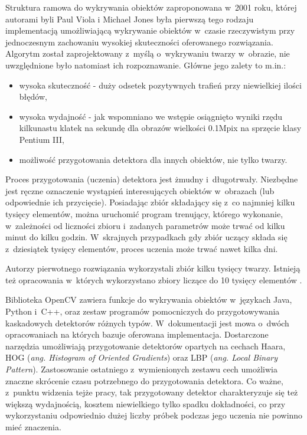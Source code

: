 Struktura ramowa do wykrywania obiektów zaproponowana w~2001 roku, której
autorami byli Paul Viola i Michael Jones \cite{DBLP:conf/cvpr/ViolaJ01}
była pierwszą tego
rodzaju implementacją umożliwiającą wykrywanie obiektów w~czasie
rzeczywistym przy jednoczesnym zachowaniu wysokiej skuteczności
oferowanego rozwiązania. Algorytm został zaprojektowany z~myślą o~wykrywaniu
twarzy w~obrazie, nie uwzględnione było natomiast ich rozpoznawanie.
Główne jego zalety to m.in.:

\begin{itemize}
\item wysoka skuteczność - duży odsetek pozytywnych trafień przy niewielkiej
ilości błędów,
\item wysoka wydajność - jak wspomniano we wstępie osiągnięto wyniki
rzędu kilkunastu klatek na sekundę dla obrazów wielkości 0.1Mpix na sprzęcie
klasy Pentium III,
\item możliwość przygotowania detektora dla innych obiektów, nie tylko
twarzy.
\end{itemize}

Proces przygotowania (uczenia) detektora jest żmudny i~długotrwały.
Niezbędne jest ręczne oznaczenie wystąpień interesujących obiektów
w~obrazach (lub odpowiednie ich przycięcie). 
Posiadając zbiór składający się z~co najmniej kilku tysięcy elementów,
można uruchomić program trenujący, którego wykonanie, w~zależności
od liczności zbioru i~zadanych parametrów może trwać od kilku minut do 
kilku godzin. W~skrajnych przypadkach gdy zbiór uczący składa
się z~dziesiątek tysięcy elementów, proces uczenia może trwać nawet
kilka dni.

Autorzy pierwotnego rozwiązania wykorzystali zbiór kilku tysięcy
twarzy. Istnieją też opracowania w~których wykorzystano zbiory
liczące do 10 tysięcy elementów \cite{WEB:ocvnaotoshiseo}.

Biblioteka OpenCV zawiera funkcje
do wykrywania obiektów w~językach Java, Python i~C++, oraz zestaw
programów pomocniczych
do przygotowywania
kaskadowych detektorów różnych typów. W~dokumentacji
\cite{OCV:cascadeclassification}
jest mowa o~dwóch opracowaniach \cite{DBLP:conf/cvpr/ViolaJ01,
DBLP:conf/icip/LienhartM02} na których bazuje oferowana
implementacja. Dostarczone narzędzia umożliwiają przygotowanie
detektorów opartych na cechach Haara, HOG 
(\textit{ang. Histogram of Oriented Gradients}) oraz LBP 
(\textit{ang. Local Binary
Pattern}). Zastosowanie ostatniego z~wymienionych zestawu cech umożliwia
znaczne skrócenie czasu potrzebnego do przygotowania detektora.
Co ważne, z~punktu widzenia tejże pracy, tak przygotowany detektor
charakteryzuje się też większą wydajnością, kosztem niewielkiego tylko 
spadku
dokładności, co przy wykorzystaniu odpowiednio dużej liczby próbek
podczas jego uczenia nie powinno mieć znaczenia.

